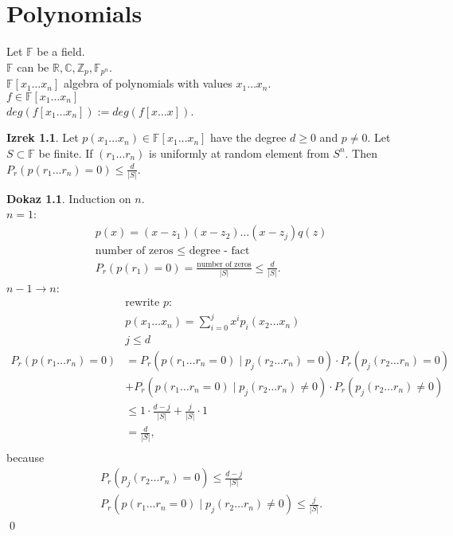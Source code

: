 \documentclass[a4paper, 12pt]{book}
\theoremstyle{definition}
\newtheorem{theorem}[counter]{Izrek}
\newtheorem{pro}[counter]{Dokaz}
\theoremstyle{remark}
\newcommand{\Z}{\mathbb{Z}}
\newcommand{\R}{\mathbb{R}}
\newcommand{\C}{\mathbb{C}}
\newcommand{\F}{\mathbb{F}}
\begin{document}
\chapter{Polynomials}


Let $\F$ be a field. \\
$\F$ can be $\R, \C, \Z_p, \F_{p^n}$. \\
$\F[x_1 \dots x_n]$ algebra of polynomials with values $x_1 \dots x_n$. \\
$f \in \F[x_1 \dots x_n]$ \\
$deg(f[x_1 \dots x_n]) := deg(f[x \dots x])$.
\begin{theorem}
  Let $p(x_1 \dots x_n) \in \F[x_1 \dots x_n]$ have the degree $d \geq 0$ and $p \neq 0$.
  Let $S \subset \F$ be finite.
  If $(r_1 \dots r_n)$ is uniformly at random element from $S^n$.
  Then $P_r(p(r_1 \dots r_n) = 0) \leq \frac{d}{|S|}$.
\end{theorem}
\begin{pro}
  Induction on $n$. \\
  $n=1$:
  \begin{align*}
    &p(x) = (x-z_1) (x-z_2) \dots (x-z_j) q(z) \\
    &\text{number of zeros } \leq \text{ degree - fact} \\
    &P_r(p(r_1) = 0) = \frac{\text{number of zeros}}{|S|} \leq \frac{d}{|S|}.
  \end{align*}
  $n-1 \to n$:
  \begin{align*}
    &\text{rewrite }p: \\
    &p(x_1 \dots x_n) = \sum_{i=0}^{j} x^i p_i(x_2 \dots x_n) \\
    &j \leq d \\
    P_r(p(r_1 \dots r_n) = 0) &= P_r(p(r_1 \dots r_n = 0) \mid p_j(r_2 \dots r_n) = 0) \cdot P_r(p_j(r_2 \dots r_n) = 0) \\
    &+ P_r(p(r_1 \dots r_n = 0) \mid p_j(r_2 \dots r_n) \neq 0) \cdot P_r(p_j(r_2 \dots r_n) \neq 0) \\
    &\leq 1 \cdot \frac{d-j}{|S|} + \frac{j}{|S|} \cdot 1 \\
    &= \frac{d}{|S|}, \\
  \end{align*}
  because
  \begin{align*}
    &P_r(p_j(r_2 \dots r_n) = 0) \leq \frac{d-j}{|S|} \\
    &P_r(p(r_1 \dots r_n = 0) \mid p_j(r_2 \dots r_n) \neq 0) \leq \frac{j}{|S|}.
  \end{align*}
  \qed
\end{pro}
\end{document}
